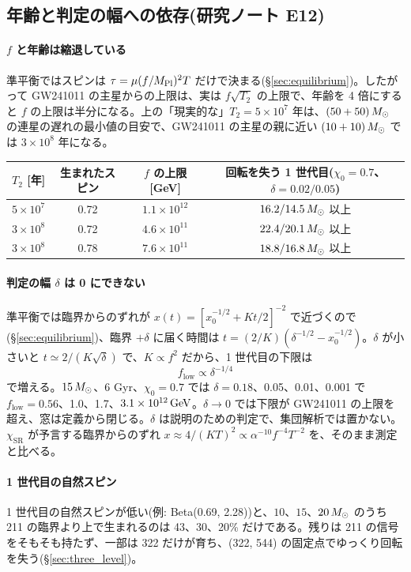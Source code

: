 \subsection{年齢と判定の幅への依存(研究ノート E12)}

\paragraph{$f$ と年齢は縮退している}
準平衡ではスピンは $\tau=\mu(f/M_\mathrm{Pl})^2T$ だけで決まる(\S\ref{sec:equilibrium})。したがって GW241011 の主星からの上限は、実は $f\sqrt{T_2}$ の上限で、年齢を 4 倍にすると $f$ の上限は半分になる。上の「現実的な」$T_2=5\times10^7$ 年は、$(50+50)\,M_\odot$ の連星の遅れの最小値の目安で、GW241011 の主星の親に近い $(10+10)\,M_\odot$ では $3\times10^8$ 年になる。
\begin{center}\small
\begin{tabular}{rccc}
\toprule
$T_2$ [年] & 生まれたスピン & $f$ の上限 [GeV] & 回転を失う 1 世代目($\chi_0=0.7$、$\delta=0.02/0.05$)\\
\midrule
$5\times10^7$ & 0.72 & $1.1\times10^{12}$ & $16.2/14.5\,M_\odot$ 以上\\
$3\times10^8$ & 0.72 & $4.6\times10^{11}$ & $22.4/20.1\,M_\odot$ 以上\\
$3\times10^8$ & 0.78 & $7.6\times10^{11}$ & $18.8/16.8\,M_\odot$ 以上\\
\bottomrule
\end{tabular}
\end{center}

\paragraph{判定の幅 $\delta$ は 0 にできない}
準平衡では臨界からのずれが $x(t)=[x_0^{-1/2}+Kt/2]^{-2}$ で近づくので(\S\ref{sec:equilibrium})、臨界 $+\delta$ に届く時間は $t=(2/K)(\delta^{-1/2}-x_0^{-1/2})$。$\delta$ が小さいと $t\simeq2/(K\sqrt\delta)$ で、$K\propto f^2$ だから、1 世代目の下限は
\begin{equation}
f_\mathrm{low}\propto\delta^{-1/4}
\end{equation}
で増える。$15\,M_\odot$、6 Gyr、$\chi_0=0.7$ では $\delta=0.18$、0.05、0.01、0.001 で $f_\mathrm{low}=0.56$、1.0、1.7、$3.1\times10^{12}\,\mathrm{GeV}$。$\delta\to0$ では下限が GW241011 の上限を超え、窓は定義から閉じる。$\delta$ は説明のための判定で、集団解析では置かない。$\chi_\mathrm{SR}$ が予言する臨界からのずれ $x\approx4/(KT)^2\propto\alpha^{-10}f^{-4}T^{-2}$ を、そのまま測定と比べる。

\paragraph{1 世代目の自然スピン}
1 世代目の自然スピンが低い(例: Beta(0.69, 2.28))と、$10$、$15$、$20\,M_\odot$ のうち 211 の臨界より上で生まれるのは 43、30、20\% だけである。残りは 211 の信号をそもそも持たず、一部は 322 だけが育ち、(322, 544) の固定点でゆっくり回転を失う(\S\ref{sec:three_level})。

